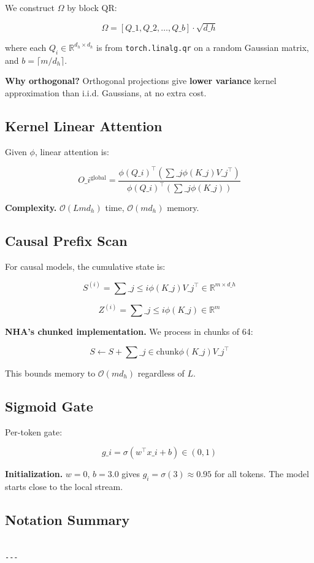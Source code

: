 We construct $\Omega$ by block QR:

\[
\Omega = [Q\_1, Q\_2, \ldots, Q\_b] \cdot \sqrt{d\_h}
\tag{3.5}
\]

where each $Q_i \in \mathbb{R}^{d_h \times d_h}$ is from \texttt{torch.linalg.qr} 
on a random Gaussian matrix, and $b = \lceil m / d_h \rceil$.

\textbf{Why orthogonal?} Orthogonal projections give \textbf{lower variance} kernel 
approximation than i.i.d. Gaussians, at no extra cost.

\subsection{Kernel Linear Attention}

Given $\phi$, linear attention is:

\[
O\_i^\text{global} = \frac{\phi(Q\_i)^\top \left(\sum\_j \phi(K\_j) V\_j^\top\right)}{\phi(Q\_i)^\top \left(\sum\_j \phi(K\_j)\right)}
\tag{3.6}
\]

\textbf{Complexity.} $\mathcal{O}(L m d_h)$ time, $\mathcal{O}(m d_h)$ memory.

\subsection{Causal Prefix Scan}

For causal models, the cumulative state is:

\[
S^{(i)} = \sum\_{j \leq i} \phi(K\_j) V\_j^\top \in \mathbb{R}^{m \times d\_h}
\tag{3.7}
\]

\[
Z^{(i)} = \sum\_{j \leq i} \phi(K\_j) \in \mathbb{R}^m
\tag{3.8}
\]

\textbf{NHA's chunked implementation.} We process in chunks of 64:

\[
S \leftarrow S + \sum\_{j \in \text{chunk}} \phi(K\_j) V\_j^\top
\tag{3.9}
\]

This bounds memory to $\mathcal{O}(m d_h)$ regardless of $L$.

\subsection{Sigmoid Gate}

Per-token gate:

\[
g\_i = \sigma(w^\top x\_i + b) \in (0, 1)
\tag{3.10}
\]

\textbf{Initialization.} $w = 0$, $b = 3.0$ gives $g_i = \sigma(3) \approx 0.95$ 
for all tokens. The model starts close to the local stream.

\subsection{Notation Summary}

\begin{lstlisting}

---
\end{lstlisting}
